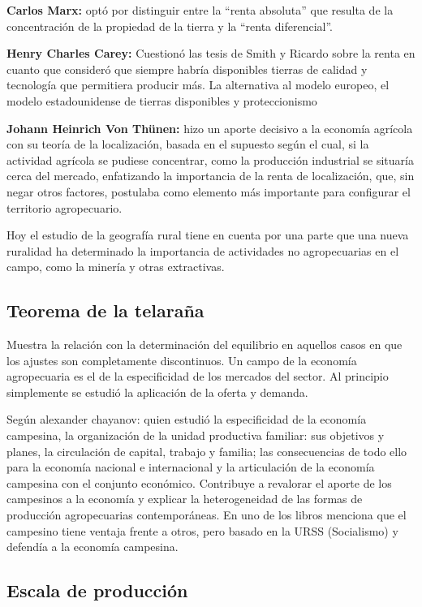\documentclass[
  letterpaper,
  DIV=11,
  numbers=noendperiod]{scrartcl}
\begin{document}
\textbf{Carlos Marx:} optó por distinguir entre la ``renta absoluta''
que resulta de la concentración de la propiedad de la tierra y la
``renta diferencial''.

\textbf{Henry Charles Carey:} Cuestionó las tesis de Smith y Ricardo
sobre la renta en cuanto que consideró que siempre habría disponibles
tierras de calidad y tecnología que permitiera producir más. La
alternativa al modelo europeo, el modelo estadounidense de tierras
disponibles y proteccionismo

\textbf{Johann Heinrich Von Thünen:} hizo un aporte decisivo a la
economía agrícola con su teoría de la localización, basada en el
supuesto según el cual, si la actividad agrícola se pudiese concentrar,
como la producción industrial se situaría cerca del mercado, enfatizando
la importancia de la renta de localización, que, sin negar otros
factores, postulaba como elemento más importante para configurar el
territorio agropecuario.

Hoy el estudio de la geografía rural tiene en cuenta por una parte que
una nueva ruralidad ha determinado la importancia de actividades no
agropecuarias en el campo, como la minería y otras extractivas.

\hypertarget{teorema-de-la-telarauxf1a}{%
\subsection{Teorema de la telaraña}\label{teorema-de-la-telarauxf1a}}

Muestra la relación con la determinación del equilibrio en aquellos
casos en que los ajustes son completamente discontinuos. Un campo de la
economía agropecuaria es el de la especificidad de los mercados del
sector. Al principio simplemente se estudió la aplicación de la oferta y
demanda.

Según alexander chayanov: quien estudió la especificidad de la economía
campesina, la organización de la unidad productiva familiar: sus
objetivos y planes, la circulación de capital, trabajo y familia; las
consecuencias de todo ello para la economía nacional e internacional y
la articulación de la economía campesina con el conjunto económico.
Contribuye a revalorar el aporte de los campesinos a la economía y
explicar la heterogeneidad de las formas de producción agropecuarias
contemporáneas. En uno de los libros menciona que el campesino tiene
ventaja frente a otros, pero basado en la URSS (Socialismo) y defendía a
la economía campesina.

\hypertarget{escala-de-producciuxf3n}{%
\subsection{Escala de producción}\label{escala-de-producciuxf3n}}
\end{document}
